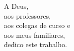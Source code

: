 \vspace{8cm}

\begin{flushright}
\hfill \textnormal{
A Deus, \\
aos professores, \\
aos colegas de curso e \\
aos meus familiares, \\
dedico este trabalho.}
\end{flushright}